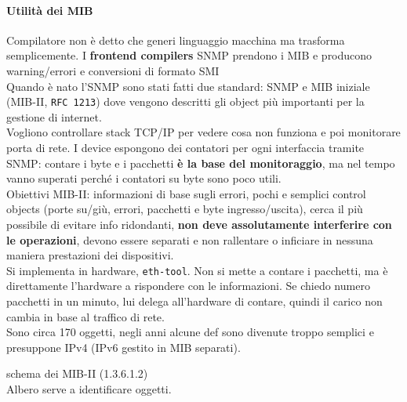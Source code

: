 \documentclass[10pt]{book}
\begin{document}
\paragraph{Utilità dei MIB} Compilatore non è detto che generi linguaggio macchina ma trasforma semplicemente. I \textbf{frontend compilers} SNMP prendono i MIB e producono warning/errori e conversioni di formato SMI\\
Quando è nato l'SNMP sono stati fatti due standard: SNMP e MIB iniziale (MIB-II, \texttt{RFC 1213}) dove vengono descritti gli object più importanti per la gestione di internet.\\
Vogliono controllare stack TCP/IP per vedere cosa non funziona e poi monitorare porta di rete. I device espongono dei contatori per ogni interfaccia tramite SNMP: contare i byte e i pacchetti \textbf{è la base del monitoraggio}, ma nel tempo vanno superati perché i contatori su byte sono poco utili.\\
Obiettivi MIB-II: informazioni di base sugli errori, pochi e semplici control objects (porte su/giù, errori, pacchetti e byte ingresso/uscita), cerca il più possibile di evitare info ridondanti, \textbf{non deve assolutamente interferire con le operazioni}, devono essere separati e non rallentare o inficiare in nessuna maniera prestazioni dei dispositivi.\\
Si implementa in hardware, \texttt{eth-tool}. Non si mette a contare i pacchetti, ma è direttamente l'hardware a rispondere con le informazioni. Se chiedo numero pacchetti in un minuto, lui delega all'hardware di contare, quindi il carico non cambia in base al traffico di rete.\\
Sono circa 170 oggetti, negli anni alcune def sono divenute troppo semplici e presuppone IPv4 (IPv6 gestito in MIB separati).
\begin{center}
	schema dei MIB-II (1.3.6.1.2)\\
	Albero serve a identificare oggetti.
\end{center}
\end{document}
